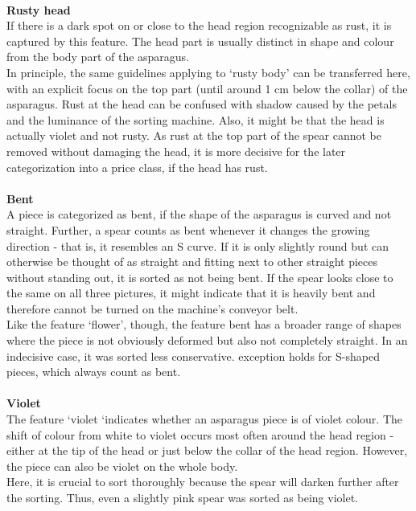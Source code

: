  \\
\textbf{Rusty head} \\
If there is a dark spot on or close to the head region recognizable as rust, it is captured by this feature. The head part is usually distinct in shape and colour from the body part of the asparagus. \\
In principle, the same guidelines applying to ‘rusty body’ can be transferred here, with an explicit focus on the top part (until around 1 cm below the collar) of the asparagus. Rust at the head can be confused with shadow caused by the petals and the luminance  of the sorting machine. Also, it might be that the head is actually violet and not rusty.
As rust at the top part of the spear cannot be removed without damaging the head, it is more decisive for the later categorization into a price class, if the head has rust. \\
 \\
\textbf{Bent} \\
A piece is categorized as bent, if the shape of the asparagus is curved and not straight.
Further, a spear counts as bent whenever it changes the growing direction - that is, it resembles an S curve. If it is only slightly round but can otherwise be thought of as straight and fitting next to other straight pieces without standing out, it is sorted as not being bent. If the spear looks close to the same on all three pictures, it might indicate that it is heavily bent and therefore cannot be turned on the machine’s conveyor belt. \\
Like the feature ‘flower’, though, the feature bent has a broader range of shapes where the piece is not obviously deformed but also not completely straight. In an indecisive case, it was sorted less conservative. exception holds for S-shaped pieces, which always count as bent.\\
 \\
\textbf{Violet} \\
The feature ‘violet ‘indicates whether an asparagus piece is of violet colour.
The shift of colour from white to violet occurs most often around the head region - either at the tip of the head or just below the collar of the head region. However, the piece can also be violet on the whole body. \\
Here, it is crucial to sort thoroughly because the spear will darken further after the sorting. Thus, even a slightly pink spear was sorted as being violet.
 \\
 \\
